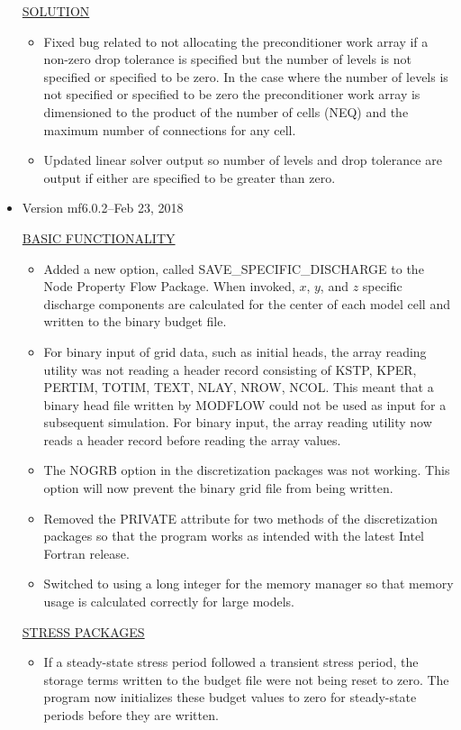 \begin{itemize}
	\underline{SOLUTION}
	\begin{itemize}
		\item Fixed bug related to not allocating the preconditioner work array if a non-zero drop tolerance is specified but the number of levels is not specified or specified to be zero. In the case where the number of levels is not specified or specified to be zero the preconditioner work array is dimensioned to the product of the number of cells (NEQ) and the maximum number of connections for any cell.
		\item Updated linear solver output so number of levels and drop tolerance are output if either are specified to be greater than zero. 
	\end{itemize}
	
	\item Version mf6.0.2--Feb 23, 2018
	
	\underline{BASIC FUNCTIONALITY}
	\begin{itemize}
		\item Added a new option, called SAVE\_SPECIFIC\_DISCHARGE to the Node Property Flow Package.  When invoked, $x$, $y$, and $z$ specific discharge components are calculated for the center of each model cell and written to the binary budget file.
		\item For binary input of grid data, such as initial heads, the array reading utility was not reading a header record consisting of KSTP, KPER, PERTIM, TOTIM, TEXT, NLAY, NROW, NCOL.  This meant that a binary head file written by MODFLOW could not be used as input for a subsequent simulation.  For binary input, the array reading utility now reads a header record before reading the array values.
		\item The NOGRB option in the discretization packages was not working.  This option will now prevent the binary grid file from being written.
		\item Removed the PRIVATE attribute for two methods of the discretization packages so that the program works as intended with the latest Intel Fortran release.
		\item Switched to using a long integer for the memory manager so that memory usage is calculated correctly for large models.
	\end{itemize}
	
	\underline{STRESS PACKAGES}
	\begin{itemize}
		\item If a steady-state stress period followed a transient stress period, the storage terms written to the budget file were not being reset to zero.  The program now initializes these budget values to zero for steady-state periods before they are written.
	\end{itemize}
	

\end{itemize}

